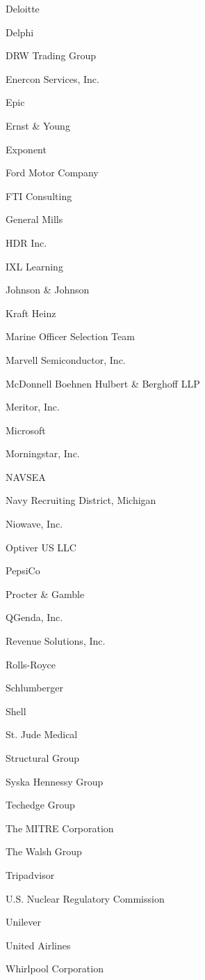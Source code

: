 \documentclass[twoside]{article}
\begin{document}
\begin{center}
\begin{multicols}{5}
\begin{FlushLeft}
\begin{compactitem}
\item Deloitte
\item Delphi
\item DRW Trading Group
\item Enercon Services, Inc.
\item Epic
\item Ernst \& Young
\item Exponent
\item Ford Motor Company
\item FTI Consulting
\item General Mills
\item HDR Inc.
\item IXL Learning
\item Johnson \& Johnson
\item Kraft Heinz
\item Marine Officer Selection Team
\item Marvell Semiconductor, Inc.
\item McDonnell Boehnen Hulbert \& Berghoff LLP
\item Meritor, Inc.
\item Microsoft
\item Morningstar, Inc.
\item NAVSEA
\item Navy Recruiting District, Michigan
\item Niowave, Inc.
\item Optiver US LLC
\item PepsiCo
\item Procter \& Gamble
\item QGenda, Inc.
\item Revenue Solutions, Inc.
\item Rolls-Royce
\item Schlumberger
\item Shell
\item St. Jude Medical
\item Structural Group
\item Syska Hennessy Group
\item Techedge Group
\item The MITRE Corporation
\item The Walsh Group
\item Tripadvisor
\item U.S. Nuclear Regulatory Commission
\item Unilever
\item United Airlines
\item Whirlpool Corporation

\end{compactitem}
\end{FlushLeft}
\end{multicols}
\end{center}
\end{document}
